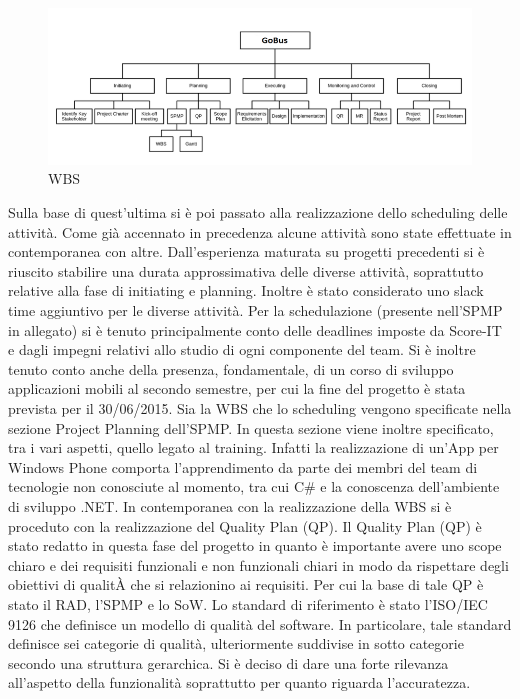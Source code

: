 \begin{figure}[tp]
\centering
\includegraphics[scale=.6]{img/6.png}
\caption{WBS}
\label{fig:cd}
\end{figure}

Sulla base di quest\rq ultima si \`{e} poi passato alla realizzazione dello scheduling delle attivit\`{a}.
Come gi\`{a} accennato in precedenza alcune attivit\`{a} sono state effettuate in contemporanea con altre. Dall\rq esperienza maturata su progetti precedenti si \`{e} riuscito stabilire una durata approssimativa delle diverse attivit\`{a}, soprattutto relative alla fase di initiating e planning.
Inoltre \`{e} stato considerato uno slack time aggiuntivo per le diverse attivit\`{a}.
Per la schedulazione (presente nell\rq SPMP in allegato) si \`{e} tenuto principalmente conto delle deadlines imposte da Score-IT e dagli impegni relativi allo studio di ogni componente del team.
Si \`{e} inoltre tenuto conto anche della presenza, fondamentale, di un corso di sviluppo applicazioni mobili al secondo semestre, per cui la fine del progetto \`{e} stata prevista per il 30/06/2015.
Sia la WBS che lo scheduling vengono specificate nella sezione Project Planning dell\rq SPMP. In questa sezione viene inoltre specificato, tra i vari aspetti, quello legato al training.
Infatti la realizzazione di un\rq App per Windows Phone comporta l\rq apprendimento da parte dei membri del team di tecnologie non conosciute al momento, tra cui C\# e la conoscenza dell\rq ambiente di sviluppo .NET. In contemporanea con la realizzazione della WBS si \`{e} proceduto con la realizzazione del Quality Plan (QP). Il Quality Plan (QP) \`{e} stato redatto in questa fase del progetto in quanto \`{e} importante avere uno scope chiaro e dei requisiti funzionali e non funzionali chiari in modo da rispettare degli obiettivi di qualit\`{A} che si relazionino ai requisiti. Per cui la base di tale QP \`{e} stato il RAD, l\rq SPMP e lo SoW.
Lo standard di riferimento \`{e} stato l\rq ISO/IEC 9126 che definisce un modello di qualit\`{a} del software. In particolare, tale standard definisce sei categorie di qualit\`{a}, ulteriormente suddivise in sotto categorie secondo una struttura gerarchica. Si \`{e} deciso di dare una forte rilevanza all\rq aspetto della funzionalit\`{a} soprattutto per quanto riguarda l\rq accuratezza.
